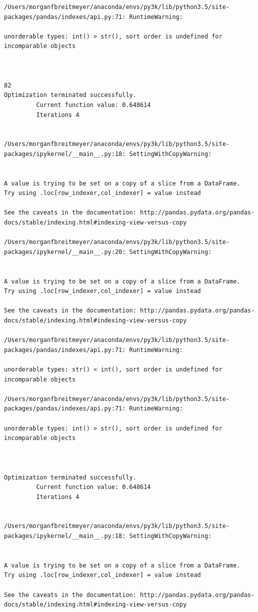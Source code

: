 \begin{lstlisting}
/Users/morganfbreitmeyer/anaconda/envs/py3k/lib/python3.5/site-packages/pandas/indexes/api.py:71: RuntimeWarning:

unorderable types: int() > str(), sort order is undefined for incomparable objects



82
Optimization terminated successfully.
         Current function value: 0.648614
         Iterations 4


/Users/morganfbreitmeyer/anaconda/envs/py3k/lib/python3.5/site-packages/ipykernel/__main__.py:18: SettingWithCopyWarning:


A value is trying to be set on a copy of a slice from a DataFrame.
Try using .loc[row_indexer,col_indexer] = value instead

See the caveats in the documentation: http://pandas.pydata.org/pandas-docs/stable/indexing.html#indexing-view-versus-copy

/Users/morganfbreitmeyer/anaconda/envs/py3k/lib/python3.5/site-packages/ipykernel/__main__.py:20: SettingWithCopyWarning:


A value is trying to be set on a copy of a slice from a DataFrame.
Try using .loc[row_indexer,col_indexer] = value instead

See the caveats in the documentation: http://pandas.pydata.org/pandas-docs/stable/indexing.html#indexing-view-versus-copy

/Users/morganfbreitmeyer/anaconda/envs/py3k/lib/python3.5/site-packages/pandas/indexes/api.py:71: RuntimeWarning:

unorderable types: str() < int(), sort order is undefined for incomparable objects

/Users/morganfbreitmeyer/anaconda/envs/py3k/lib/python3.5/site-packages/pandas/indexes/api.py:71: RuntimeWarning:

unorderable types: int() > str(), sort order is undefined for incomparable objects



Optimization terminated successfully.
         Current function value: 0.648614
         Iterations 4


/Users/morganfbreitmeyer/anaconda/envs/py3k/lib/python3.5/site-packages/ipykernel/__main__.py:18: SettingWithCopyWarning:


A value is trying to be set on a copy of a slice from a DataFrame.
Try using .loc[row_indexer,col_indexer] = value instead

See the caveats in the documentation: http://pandas.pydata.org/pandas-docs/stable/indexing.html#indexing-view-versus-copy


\end{lstlisting}
